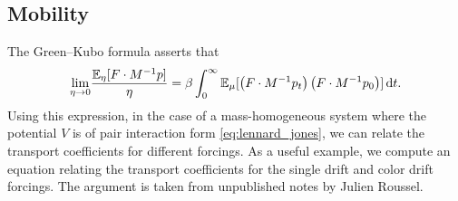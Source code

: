 \subsection{Mobility}
The Green--Kubo formula asserts that
\begin{equation}
    \label{eq:green_kubo_mobility}
    \underset{\eta\to 0}{\lim} \frac{\mathbb{E}_\eta[F\cdot M^{-1}p]}{\eta}=\beta \int_{0}^\infty \mathbb{E}_\mu[\left(F\cdot M^{-1}p_t\right)\left(F\cdot M^{-1}p_0\right)]\,\mathrm{d} t.
\end{equation}
Using this expression, in the case of a mass-homogeneous system where the potential $V$ is of pair interaction form \eqref{eq:lennard_jones}, we can relate the transport coefficients for different forcings.
As a useful example, we compute an equation relating the transport coefficients for the single drift and color drift forcings. The argument is taken from unpublished notes by Julien Roussel.
